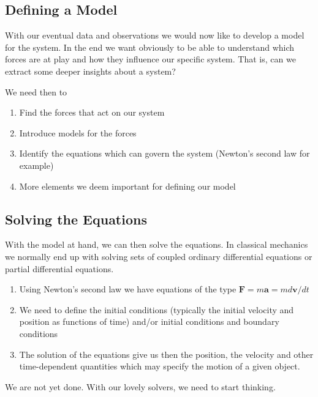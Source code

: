 \documentclass[%
oneside,                 %
final,                   %
10pt]{article}
\begin{document}
\noindent
\subsection{Defining a Model}

With our eventual data and observations we would now like to develop a
model for the system. In the end we want obviously to be able to
understand which forces are at play and how they influence our
specific system. That is, can we extract some deeper insights about a
system?

We need then to
\begin{enumerate}
\item Find the forces that act on our system

\item Introduce models for the forces

\item Identify the equations which can govern the system (Newton's second law for example)

\item More elements we deem important for defining our model
\end{enumerate}

\noindent
\subsection{Solving the Equations}

With the model at hand, we can then solve the equations. In classical mechanics we normally end up  with solving sets of coupled ordinary differential equations or partial differential equations.
\begin{enumerate}
\item Using Newton's second law we have equations of the type $\bm{F}=m\bm{a}=md\bm{v}/dt$

\item We need to  define the initial conditions (typically the initial velocity and position as functions of time) and/or initial conditions and boundary conditions

\item The solution of the equations give us then the position, the velocity and other time-dependent quantities which may specify the motion of a given object.
\end{enumerate}

\noindent
We are not yet done. With our lovely solvers, we need to start thinking.
\end{document}
